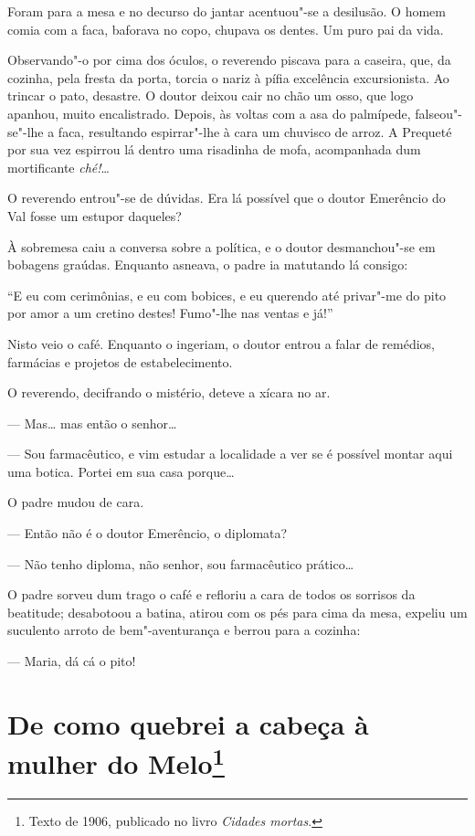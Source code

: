 Foram para a mesa e no decurso do jantar acentuou"-se a desilusão. O
homem comia com a faca, baforava no copo, chupava os dentes. Um puro pai
da vida.

Observando"-o por cima dos óculos, o reverendo piscava para a caseira,
que, da cozinha, pela fresta da porta, torcia o nariz à pífia excelência
excursionista. Ao trincar o pato, desastre. O doutor deixou cair no chão
um osso, que logo apanhou, muito encalistrado. Depois, às voltas com a
asa do palmípede, falseou"-se"-lhe a faca, resultando espirrar"-lhe à cara
um chuvisco de arroz. A Prequeté por sua vez espirrou lá dentro uma
risadinha de mofa, acompanhada dum mortificante \emph{ché!}\ldots{}

O reverendo entrou"-se de dúvidas. Era lá possível que o doutor Emerêncio
do Val fosse um estupor daqueles?

À sobremesa caiu a conversa sobre a política, e o doutor desmanchou"-se
em bobagens graúdas. Enquanto asneava, o padre ia matutando lá consigo:

``E eu com cerimônias, e eu com bobices, e eu querendo até privar"-me do
pito por amor a um cretino destes! Fumo"-lhe nas ventas e já!''

Nisto veio o café. Enquanto o ingeriam, o doutor entrou a falar de
remédios, farmácias e projetos de estabelecimento.

O reverendo, decifrando o mistério, deteve a xícara no ar.

--- Mas\ldots{} mas então o senhor\ldots{}

--- Sou farmacêutico, e vim estudar a localidade a ver se é possível
montar aqui uma botica. Portei em sua casa porque\ldots{}

O padre mudou de cara.

--- Então não é o doutor Emerêncio, o diplomata?

--- Não tenho diploma, não senhor, sou farmacêutico prático\ldots{}

O padre sorveu dum trago o café e refloriu a cara de todos os sorrisos
da beatitude; desabotoou a batina, atirou com os pés para cima da mesa,
expeliu um suculento arroto de bem"-aventurança e berrou para a cozinha:

--- Maria, dá cá o pito!

\chapter{De como quebrei a cabeça à mulher do Melo\footnote[*]{Texto de 1906, publicado no livro \emph{Cidades mortas}.}}

